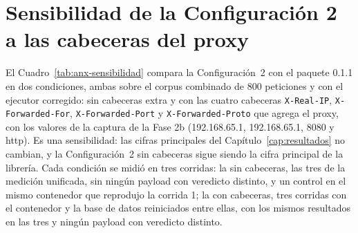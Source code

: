 \section{Sensibilidad de la Configuración 2 a las cabeceras del proxy}
\label{anx:sensibilidad}

El Cuadro~\ref{tab:anx-sensibilidad} compara la Configuración~2 con el paquete 0.1.1 en dos
condiciones, ambas sobre el corpus combinado de 800 peticiones y con el ejecutor corregido: sin
cabeceras extra y con las cuatro cabeceras \texttt{X-Real-IP}, \texttt{X-Forwarded-For},
\texttt{X-Forwarded-Port} y \texttt{X-Forwarded-Proto} que agrega el proxy, con los valores de la
captura de la Fase 2b (192.168.65.1, 192.168.65.1, 8080 y http). Es una sensibilidad: las cifras
principales del Capítulo~\ref{cap:resultados} no cambian, y la Configuración~2 sin cabeceras sigue
siendo la cifra principal de la librería. Cada condición se midió en tres corridas: la sin
cabeceras, las tres de la medición unificada, sin ningún payload con veredicto distinto, y un
control en el mismo contenedor que reprodujo la corrida 1; la con cabeceras, tres corridas con el
contenedor y la base de datos reiniciados entre ellas, con los mismos resultados en las tres y
ningún payload con veredicto distinto.

